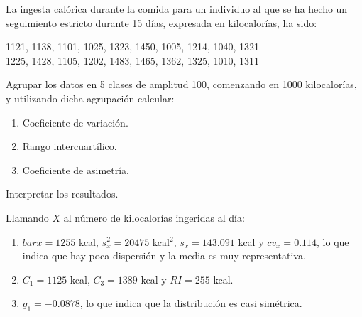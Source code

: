 { La ingesta calórica durante la comida para un individuo al que se ha hecho un seguimiento estricto durante 15 días, expresada en
kilocalorías, ha sido:
\begin{center}
1121, 1138, 1101, 1025, 1323, 1450, 1005, 1214, 1040, 1321 \\
1225, 1428, 1105, 1202, 1483, 1465, 1362, 1325, 1010, 1311
\end{center}
Agrupar los datos en 5 clases de amplitud 100, comenzando en 1000 kilocalorías, y utilizando dicha agrupación calcular:
\begin{enumerate}
\item Coeficiente de variación.
\item Rango intercuartílico.
\item Coeficiente de asimetría.
\end{enumerate}
Interpretar los resultados.
}
{Llamando $X$ al número de kilocalorías ingeridas al día:
\begin{enumerate}
\item $bar x= 1255$ kcal, $s_x^2=20475$ kcal$^2$, $s_x=143.091$ kcal y $cv_x=0.114$, lo que indica que hay poca dispersión y la media es
muy representativa.
\item $C_1=1125$ kcal, $C_3=1389$ kcal y $RI=255$ kcal.
\item $g_{1}=-0.0878$, lo que indica que la distribución es casi simétrica.
\end{enumerate}
}
